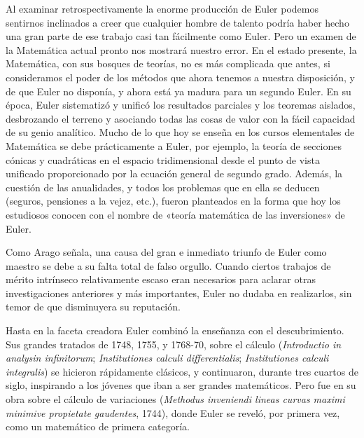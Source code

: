 \documentclass[a4paper, 12pt]{article}
\begin{document}
Al examinar retrospectivamente la enorme producción de Euler podemos sentirnos inclinados a creer que cualquier hombre de talento podría haber hecho una gran parte de ese trabajo casi tan fácilmente como Euler. Pero un examen de la Matemática actual pronto nos mostrará nuestro error. En el estado presente, la Matemática, con sus bosques de teorías, no es más complicada que antes, si consideramos el poder de los métodos que ahora tenemos a nuestra disposición, y de que Euler no disponía, y ahora está ya madura para un segundo Euler. En su época, Euler sistematizó y unificó los resultados parciales y los teoremas aislados, desbrozando el terreno y asociando todas las cosas de valor con la fácil capacidad de su genio analítico. Mucho de lo que hoy se enseña en los cursos elementales de Matemática se debe prácticamente a Euler, por ejemplo, la teoría de secciones cónicas y cuadráticas en el espacio tridimensional desde el punto de vista unificado proporcionado por la ecuación general de segundo grado. Además, la cuestión de las anualidades, y todos los problemas que en ella se deducen (seguros, pensiones a la vejez, etc.), fueron planteados en la forma que hoy los estudiosos conocen con el nombre de «teoría matemática de las inversiones» de Euler.

Como Arago señala, una causa del gran e inmediato triunfo de Euler como maestro se debe a su falta total de falso orgullo. Cuando ciertos trabajos de mérito intrínseco relativamente escaso eran necesarios para aclarar otras investigaciones anteriores y más importantes, Euler no dudaba en realizarlos, sin temor de que disminuyera su reputación.

Hasta en la faceta creadora Euler combinó la enseñanza con el descubrimiento. Sus grandes tratados de 1748, 1755, y 1768-70, sobre el cálculo ({\it Introductio in analysin infinitorum}; {\it Institutiones calculi differentialis}; {\it Institutiones calculi integralis}) se hicieron rápidamente clásicos, y continuaron, durante tres cuartos de siglo, inspirando a los jóvenes que iban a ser grandes matemáticos. Pero fue en su obra sobre el cálculo de variaciones ({\it Methodus inveniendi lineas curvas maximi minimive propietate gaudentes}, 1744), donde Euler se reveló, por primera vez, como un matemático de primera categoría. 
\end{document}
